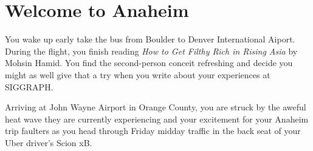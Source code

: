 \documentclass[../main.tex]{subfiles}
\begin{document}
\section{Welcome to Anaheim}

You wake up early take the bus from Boulder to Denver International Aiport. During the flight, you finish reading \textit{How to Get Filthy Rich in Rising Asia} by Mohsin Hamid. You find the second-person conceit refreshing and decide you might as well give that a try when you write about your experiences at SIGGRAPH.

Arriving at John Wayne Airport in Orange County, you are struck by the aweful heat wave they are currently experiencing and your excitement for your Anaheim trip faulters as you head through Friday midday traffic in the back seat of your Uber driver's Scion xB.
 
\end{document}
